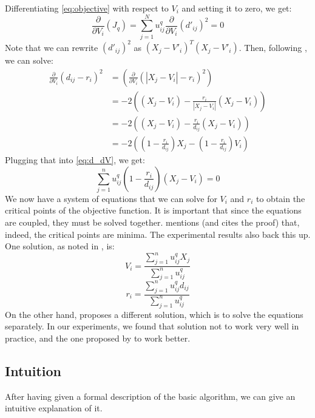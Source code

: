 \documentclass[conference]{IEEEtran}
\begin{document}
Differentiating \eqref{eq:objective} with respect to $V_i$ and setting it to zero, we get:
\begin{equation}\label{eq:d_dV}
\frac{\partial}{\partial V_i}(J_q) = \sum_{j=1}^{N} u_{ij}^q\frac{\partial}{\partial V_i} (d'_{ij})^2 = 0
\end{equation}
Note that we can rewrite $(d'_{ij})^2$ as $(X_j - V'_i)^T(X_j - V'_i)$.
Then, following \cite{308484}, we can solve:
\begin{equation}
\begin{aligned}
\frac{\partial}{\partial V_i} (d_{ij} - r_i)^2 &= \left(\frac{\partial}{\partial V_i} (|X_j - V_i| - r_i)^2\right) \\
&= -2 \left( (X_j - V_i) - \frac{r_i}{|X_j - V_i|} (X_j - V_i) \right) \\
&= -2 \left( (X_j - V_i) - \frac{r_i}{d_{ij}} (X_j - V_i) \right) \\
&= -2 \left( (1 - \frac{r_i}{d_{ij}})X_j - (1 - \frac{r_i}{d_{ij}})V_i \right)
\end{aligned}
\end{equation}
Plugging that into \eqref{eq:d_dV}, we get:
\begin{equation}
\sum_{j=1}^{n} u_{ij}^q (1 - \frac{r_i}{d_{ij}})(X_j - V_i) = 0
\end{equation}
We now have a system of equations that we can solve for $V_i$ and $r_i$ to obtain the critical points of the objective function. It is important that since
the equations are coupled, they must be solved together. \cite{DAVE1992713} mentions (and cites the proof) that, indeed, the critical
points are minima. The experimental results also back this up.
One solution, as noted in \cite{DAVE1992713}, is:
\begin{equation}
V_i = \frac{\sum_{j=1}^{n} u_{ij}^q X_j}{\sum_{j=1}^{n} u_{ij}^q}
\end{equation}
\begin{equation}\label{eq:r_i}
r_i = \frac{\sum_{j=1}^{n} u_{ij}^q d_{ij}}{\sum_{j=1}^{n} u_{ij}^q}
\end{equation}
On the other hand, \cite{308484} proposes a different solution, which is to solve the equations separately. In our experiments, we found that solution not to work very
well in practice, and the one proposed by \cite{DAVE1992713} to work better.

\subsection{Intuition}
After having given a formal description of the basic algorithm, we can give an intuitive explanation of it.
\end{document}
